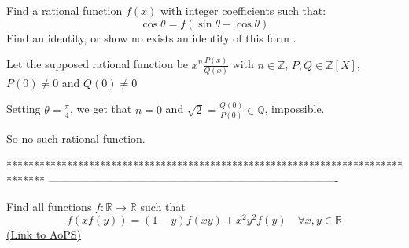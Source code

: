 \begin{solution}
	\begin{tcolorbox}Find a rational function $f(x)$ with integer coefficients such that:
\[\cos \theta = f(\sin \theta - \cos \theta)\]
Find an identity, or show no exists an identity of this form .\end{tcolorbox}
Let the supposed rational function be $x^n\frac {P(x)}{Q(x)}$ with $n\in\mathbb Z$, $P,Q\in\mathbb Z[X]$, $P(0)\ne 0$ and $Q(0)\ne 0$

Setting $\theta=\frac{\pi}4$, we get that $n=0$ and $\sqrt 2=\frac{Q(0)}{P(0)}\in\mathbb Q$, impossible.

So no such rational function.
\end{solution}
*******************************************************************************
-------------------------------------------------------------------------------

\begin{problem}
	Find all functions $f:\mathbb R\to\mathbb R$ such that
\[f(xf(y))=(1-y)f(xy)+x^{2}y^{2}f(y) \quad \forall x,y\in\mathbb R\]
	\flushright \href{https://artofproblemsolving.com/community/c6h566443}{(Link to AoPS)}
\end{problem}



